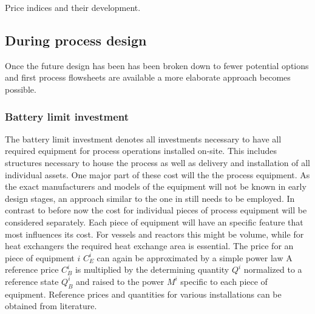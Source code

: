 \begin{table}
	\center
	
	\caption{Price indices and their development.}
	\label{tab:PriceIndices}
\end{table}

\subsection{During process design}
Once the future design has been has been broken down to fewer potential options and first process
flowsheets are available a more elaborate approach becomes possible.

\subsubsection{Battery limit investment}
The battery limit investment denotes all investments necessary to have all required equipment
for process operations installed on-site. This includes structures necessary to house the process as well as
delivery and installation of all individual assets.  One major part of these cost will the the process
equipment. As the exact manufacturers and models of the equipment will not be known in early design
stages, an approach similar to the one in  still needs to be employed. In contrast to
before now the cost for individual pieces of process equipment will be considered separately.
Each piece of equipment will have an specific feature that most influences its cost. For vessels and
reactors this might be volume, while for heat exchangers the required heat exchange area is essential.
The price for an piece of equipment  $i$ $C^{i}_E$ can again be approximated by a simple power law
%
A reference price $C^{i}_B$ is multiplied by the determining quantity $Q^{i}$ normalized to a reference state
$Q^{i}_B$ and raised to the power $M^{i}$ specific to each piece of equipment. Reference prices and
quantities for various installations can be obtained from literature.

